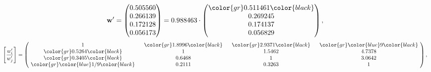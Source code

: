 \begin{example}
\begin{equation*}
\mathbf{w}^{\prime} =
\begin{pmatrix}
0.505560\\
0.266139\\
0.172128\\
0.056173
\end{pmatrix} =
0.988463\cdot
\begin{pmatrix}
\color{gr} 0.511461\color{black} \\
0.269245\\
0.174137\\
0.056829
\end{pmatrix},
\end{equation*}
\begin{equation*}
\left[ \frac{{w}^{\prime}_i}{{w}^{\prime}_j} \right] =
\begin{pmatrix}
$\,\,$ 1 $\,\,$ & $\,\,$\color{gr} 1.8996\color{black} $\,\,$ & $\,\,$\color{gr} 2.9371\color{black} $\,\,$ & $\,\,$\color{gr} \color{blue} 9\color{black} $\,\,$ \\
$\,\,$\color{gr} 0.5264\color{black} $\,\,$ & $\,\,$ 1 $\,\,$ & $\,\,$1.5462$\,\,$ & $\,\,$4.7378  $\,\,$ \\
$\,\,$\color{gr} 0.3405\color{black} $\,\,$ & $\,\,$0.6468$\,\,$ & $\,\,$ 1 $\,\,$ & $\,\,$3.0642 $\,\,$ \\
$\,\,$\color{gr} \color{blue}  1/9\color{black} $\,\,$ & $\,\,$0.2111$\,\,$ & $\,\,$0.3263$\,\,$ & $\,\,$ 1  $\,\,$ \\
\end{pmatrix},
\end{equation*}
\end{example}
\newpage

